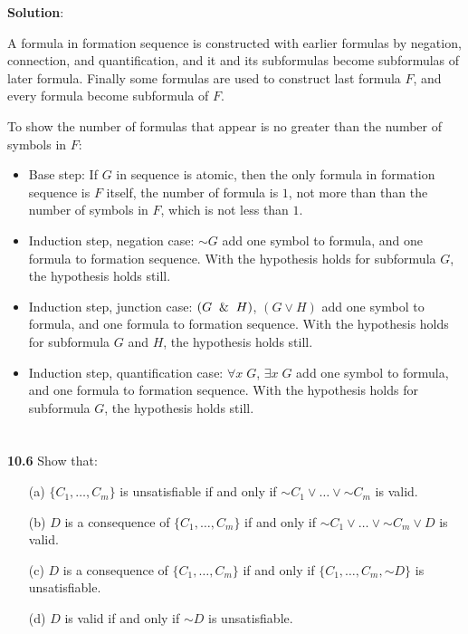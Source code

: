\documentclass{ctexart}
\newcommand{\unsim}{\mathord{\sim}}
\begin{document}
\textbf{Solution}:

A formula in formation sequence is constructed with earlier formulas by negation, connection, and
quantification, and it and its subformulas become subformulas of later formula. Finally some
formulas are used to construct last formula $F$, and every formula become subformula of $F$.

To show the number of formulas that appear is no greater than the number of symbols in $F$:
\begin{itemize}
	\item Base step: If $G$ in sequence is atomic, then the only formula in formation sequence is $F$ itself,
	the number of formula is $1$, not more than than the number of symbols in $F$, which is not less
	than $1$.
	
	\item Induction step, negation case: $\unsim G$ add one symbol to formula, and one formula to formation
	sequence. With the hypothesis holds for subformula $G$, the hypothesis holds still.
	
	\item Induction step, junction case: $(G \And H)$, $(G \lor H)$ add one symbol to formula, and one formula to formation
	sequence. With the hypothesis holds for subformula $G$ and $H$, the hypothesis holds still.
	
	\item Induction step, quantification case: $\forall x\; G$, $\exists x\; G$ add one symbol to formula, and one formula to formation
	sequence. With the hypothesis holds for subformula $G$, the hypothesis holds still.
\end{itemize}

\section*{}
\textbf{10.6} Show that:
\begin{itemize}
\item[(a)] $\{C_1 , \dots , C_m \}$ is unsatisfiable if and only if $\unsim C_1 \lor \dots \lor \unsim C_m$ is valid.
\item[(b)] $D$ is a consequence of $\{C_1 , \dots , C_m \}$ if and only if $\unsim C_1 \lor \dots \lor \unsim C_m \lor D$
is valid.
\item[(c)] $D$ is a consequence of $\{C_1 , \dots , C_m \}$ if and only if $\{C_1 , \dots , C_m, \unsim D\}$ is
unsatisfiable.
\item[(d)] $D$ is valid if and only if $\unsim D$ is unsatisfiable.
\end{itemize}
\end{document}
